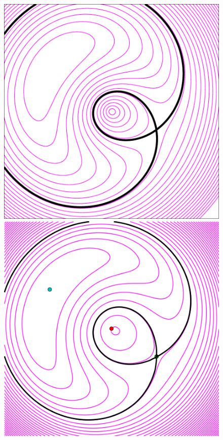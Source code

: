 \begin{figure}
  \includegraphics[width=\myplotswidth]{fig/ASW000102p_006941_arriv} 
  \includegraphics[width=\myplotswidth]{fig/006941_spaghetti} \\

\end{figure}
